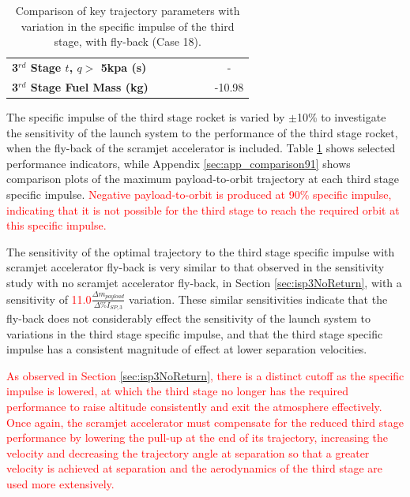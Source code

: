 \begin{table}[ht]
\begin{tabular}{l c c c c c c}
		\textbf{3$^{rd}$ Stage $t$, $q >$ 5kpa (s)}
		& \thirdqOverFiveISPThreeNinety
		& \thirdqOverFiveISPThreeNinetyFive
		& \thirdqOverFiveISPThreeStandard
		& \thirdqOverFiveISPThreeOneHundredFive
		& \thirdqOverFiveISPThreeOneHundredTen
		& -
		\\
		\textbf{3$^{rd}$ Stage Fuel Mass (kg)}
		& \thirdmFuelISPThreeNinety
		& \thirdmFuelISPThreeNinetyFive
		& \thirdmFuelISPThreeStandard
		& \thirdmFuelISPThreeOneHundredFive
		& \thirdmFuelISPThreeOneHundredTen
		&-10.98
		\\
		\hline 
	\end{tabular} 
	\caption{Comparison of key trajectory parameters with variation in the specific impulse of the third stage, with fly-back (Case 18).}
	\label{tab:isp3}
\end{table}


The specific impulse of the third stage rocket is varied by $\pm$10\% to investigate the sensitivity of the launch system to the performance of the third stage rocket, when the fly-back of the scramjet accelerator is included. 
Table \ref{tab:isp3} shows selected performance indicators, while Appendix \ref{sec:app_comparison91} shows comparison plots of the maximum payload-to-orbit trajectory at each third stage specific impulse. \textcolor{red}{Negative payload-to-orbit is produced at 90\% specific impulse, indicating that it is not possible for the third stage to reach the required orbit at this specific impulse. }

The sensitivity of the optimal trajectory to the third stage specific impulse with scramjet accelerator fly-back is very similar to that observed in the sensitivity study with no scramjet accelerator fly-back, in Section \ref{sec:isp3NoReturn}, with a sensitivity of \textcolor{red}{11.0}$\frac{\Delta m_{payload}}{\Delta\%I_{SP,3}}$ variation. 
These similar sensitivities indicate that the fly-back does not considerably effect the sensitivity of the launch system to variations in the third stage specific impulse, and that the third stage specific impulse has a consistent magnitude of effect at lower separation velocities. 

\textcolor{red}{As observed in Section \ref{sec:isp3NoReturn}, there is a distinct cutoff as the specific impulse is lowered, at which the third stage no longer has the required performance to raise altitude consistently and exit the atmosphere effectively. Once again, the scramjet accelerator must compensate for the reduced third stage performance by lowering the pull-up at the end of its trajectory, increasing the velocity and decreasing the trajectory angle at separation so that a greater velocity is achieved at separation and the aerodynamics of the third stage are used more extensively.} 






